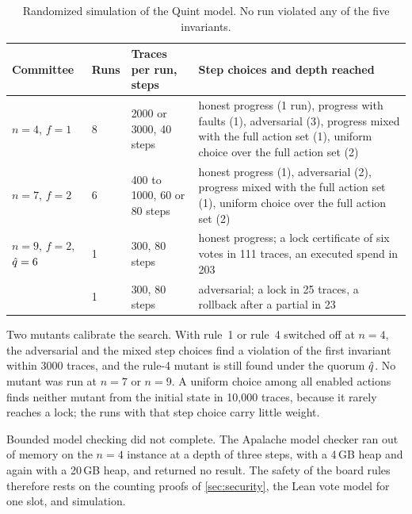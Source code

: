 \begin{table}[t]
\centering
\small
\begin{tabularx}{\linewidth}{@{}lll>{\raggedright\arraybackslash}X@{}}
\toprule
Committee & Runs & Traces per run, steps & Step choices and depth reached \\
\midrule
$n = 4$, $f = 1$ & 8 & 2000 or 3000, 40 steps & honest progress (1 run), progress with faults (1), adversarial (3), progress mixed with the full action set (1), uniform choice over the full action set (2) \\
$n = 7$, $f = 2$ & 6 & 400 to 1000, 60 or 80 steps & honest progress (1), adversarial (2), progress mixed with the full action set (1), uniform choice over the full action set (2) \\
$n = 9$, $f = 2$, $\hat{q} = 6$ & 1 & 300, 80 steps & honest progress; a lock certificate of six votes in 111 traces, an executed spend in 203 \\
 & 1 & 300, 80 steps & adversarial; a lock in 25 traces, a rollback after a partial in 23 \\
\bottomrule
\end{tabularx}
\caption{Randomized simulation of the Quint model. No run violated any of the five invariants.}
\label{tab:quint}
\end{table}

Two mutants calibrate the search. With rule~1 or rule~4 switched off at $n = 4$, the adversarial and the mixed step choices find a violation of the first invariant within 3000 traces, and the rule-4 mutant is still found under the quorum $\hat{q}$. No mutant was run at $n = 7$ or $n = 9$. A uniform choice among all enabled actions finds neither mutant from the initial state in 10{,}000 traces, because it rarely reaches a lock; the runs with that step choice carry little weight.

Bounded model checking did not complete. The Apalache model checker ran out of memory on the $n = 4$ instance at a depth of three steps, with a 4\,GB heap and again with a 20\,GB heap, and returned no result. The safety of the board rules therefore rests on the counting proofs of \cref{sec:security}, the Lean vote model for one slot, and simulation.
